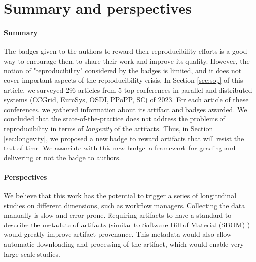 \documentclass[sigconf,natbib=false]{acmart}
\newcommand{\eg}{\emph{e.g.,}}
\begin{document}
\section{Summary and perspectives}\label{sec:conclu}

\paragraph{Summary}

The badges given to the authors to reward their reproducibility efforts is a good way to encourage them to share their work and improve its quality.
However, the notion of "reproducibility" considered by the badges is limited, and it does not cover important aspects of the reproducibility crisis.
In Section \ref{sec:sop} of this article, we surveyed 296 articles from 5 top conferences in parallel and distributed systems (CCGrid, EuroSys, OSDI, PPoPP, SC) of 2023.
For each article of these conferences, we gathered information about its artifact and badges awarded.
We concluded that the state-of-the-practice does not address the problems of reproducibility in terms of \emph{longevity} of the artifacts.
Thus, in Section \ref{sec:longevity}, we proposed a new badge to reward artifacts that will resist the test of time.
We associate with this new badge, a framework for grading and delivering or not the badge to authors.

\paragraph{Perspectives}

We believe that this work has the potential to trigger a series of longitudinal studies on different dimensions, such as workflow managers.
Collecting the data manually is slow and error prone.
Requiring artifacts to have a standard to describe the metadata of artifacts (similar to Software Bill of Material (SBOM) \cite{sbom, xia2023empirical}) would greatly improve artifact provenance.%
This metadata would also allow automatic downloading and processing of the artifact, which would enable very large scale studies.
\end{document}
